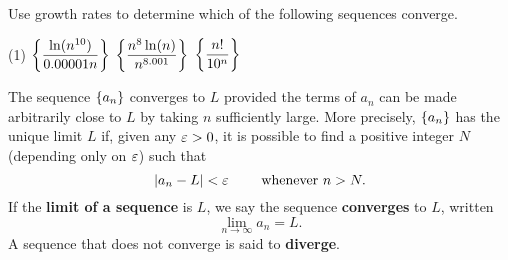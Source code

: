 \documentclass[../mathNotesPreamble]{subfiles}
\begin{document}
  \begin{ex*}
    Use growth rates to determine which of the following sequences converge.
  \end{ex*}
  \begin{tasks}[after-item-skip=\stretch{1}, label=,item-indent=0pt](1)
    \task $\displaystyle{\left\{\frac{\ln(n^{10})}{0.00001n}\right\}}$
    \task $\displaystyle{\left\{\frac{n^8\ln(n)}{n^{8.001}}\right\}}$
    \task $\displaystyle{\left\{\frac{n!}{10^n}\right\}}$
  \end{tasks}
  \pagebreak

  \begin{defn*}
    The sequence ${\left\{a_n\right\}}$ converges to $L$ provided the terms of $a_n$ can be made arbitrarily close to $L$ by taking $n$ sufficiently large. More precisely, ${\left\{a_n\right\}}$ has the unique limit $L$ if, given any $\varepsilon >0$, it is possible to find a positive integer $N$ (depending only on $\varepsilon$) such that
      \[{\left\vert a_n-L\right\vert}< \varepsilon \qquad \textnormal{ whenever } n>N.\]
    If the \textbf{limit of a sequence} is $L$, we say the sequence \textbf{converges} to $L$, written
      \[\lim_{n\to \infty} a_n=L.\]
    A sequence that does not converge is said to \textbf{diverge}.
  \end{defn*}

\pagebreak
\end{document}
